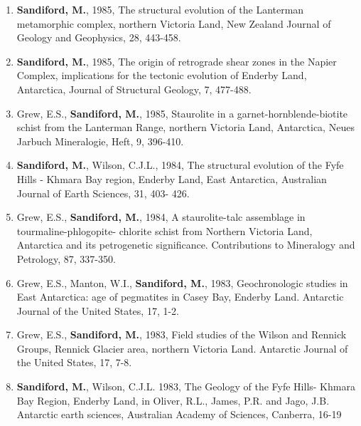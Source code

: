 \documentclass[
]{article}
\begin{document}
\begin{enumerate}
  \\
\item
  \textbf{Sandiford, M.}, 1985, The structural evolution of the
  Lanterman metamorphic complex, northern Victoria Land, New Zealand
  Journal of Geology and Geophysics, 28, 443-458.\\
\item
  \textbf{Sandiford, M.}, 1985, The origin of retrograde shear zones in
  the Napier Complex, implications for the tectonic evolution of Enderby
  Land, Antarctica, Journal of Structural Geology, 7, 477-488.
  \\
\item
  Grew, E.S., \textbf{Sandiford, M.}, 1985, Staurolite in a
  garnet-hornblende-biotite schist from the Lanterman Range, northern
  Victoria Land, Antarctica, Neues Jarbuch Mineralogie, Heft, 9,
  396-410. \\
\item
  \textbf{Sandiford, M.}, Wilson, C.J.L., 1984, The structural evolution
  of the Fyfe Hills - Khmara Bay region, Enderby Land, East Antarctica,
  Australian Journal of Earth Sciences, 31, 403- 426.
\item
  Grew, E.S., \textbf{Sandiford, M.}, 1984, A staurolite-talc assemblage
  in tourmaline-phlogopite- chlorite schist from Northern Victoria Land,
  Antarctica and its petrogenetic significance. Contributions to
  Mineralogy and Petrology, 87, 337-350. \\
\item
  Grew, E.S., Manton, W.I., \textbf{Sandiford, M.}, 1983, Geochronologic
  studies in East Antarctica: age of pegmatites in Casey Bay, Enderby
  Land. Antarctic Journal of the United States, 17, 1-2.
\item
  Grew, E.S., \textbf{Sandiford, M.}, 1983, Field studies of the Wilson
  and Rennick Groups, Rennick Glacier area, northern Victoria Land.
  Antarctic Journal of the United States, 17, 7-8.
\item
  \textbf{Sandiford, M.}, Wilson, C.J.L. 1983, The Geology of the Fyfe
  Hills- Khmara Bay Region, Enderby Land, in Oliver, R.L., James, P.R.
  and Jago, J.B. Antarctic earth sciences, Australian Academy of
  Sciences, Canberra, 16-19 
\end{enumerate}
\end{document}
